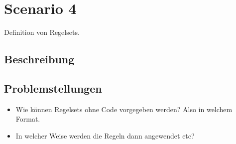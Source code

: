 \section{Scenario 4}\label{scenarios:scenario4}
Definition von Regelsets.
\subsection*{Beschreibung}
\subsection*{Problemstellungen}
\begin{itemize}
  \item Wie können Regelsets ohne Code vorgegeben werden? Also in welchem Format.
  \item In welcher Weise werden die Regeln dann angewendet etc?
\end{itemize}
